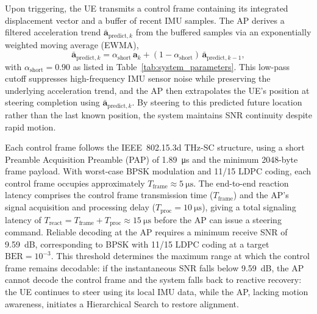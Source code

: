 \documentclass[fleqn,10pt]{wlscirep}
\newcommand{\rev}[1]{{\color{revblue}#1}}
\begin{document}
Upon triggering, the UE transmits a control frame containing its integrated displacement vector and a buffer of recent IMU samples. \rev{The AP derives a filtered acceleration trend $\bar{\mathbf{a}}_{\text{predict},k}$ from the buffered samples via an exponentially weighted moving average (EWMA),
\begin{equation}
    \bar{\mathbf{a}}_{\text{predict},k} = \alpha_{\text{short}}\, \mathbf{a}_k + (1 - \alpha_{\text{short}})\, \bar{\mathbf{a}}_{\text{predict},k-1},
    \label{eq:ewma_predict}
\end{equation}
with $\alpha_{\text{short}} = 0.90$ as listed in Table~\ref{tab:system_parameters}. This low-pass cutoff suppresses high-frequency IMU sensor noise while preserving the underlying acceleration trend, and the AP then extrapolates the UE's position at steering completion using $\bar{\mathbf{a}}_{\text{predict},k}$.} By steering to this predicted future location rather than the last known position, the system maintains SNR continuity despite rapid motion.

Each control frame follows the IEEE~802.15.3d THz-SC structure\cite{9269931}, using a short Preamble Acquisition Preamble (PAP) of \SI{1.89}{\micro\second} and the minimum 2048-byte frame payload. With worst-case BPSK modulation and 11/15 LDPC coding, each control frame occupies approximately $T_{\text{frame}} \approx \SI{5}{\micro\second}$. The end-to-end reaction latency comprises the control frame transmission time ($T_{\text{frame}}$) and the AP's signal acquisition and processing delay ($T_{\text{proc}} = \SI{10}{\micro\second}$), giving a total signaling latency of $T_{\text{react}} = T_{\text{frame}} + T_{\text{proc}} \approx \SI{15}{\micro\second}$ before the AP can issue a steering command. Reliable decoding at the AP requires a minimum receive SNR of \SI{9.59}{\deci\bel}, corresponding to BPSK with 11/15 LDPC coding at a target $\text{BER} = 10^{-3}$. This threshold determines the maximum range at which the control frame remains decodable: if the instantaneous SNR falls below \SI{9.59}{\deci\bel}, the AP cannot decode the control frame and the system falls back to reactive recovery: the UE continues to steer using its local IMU data, while the AP, lacking motion awareness, initiates a Hierarchical Search to restore alignment.
\end{document}
